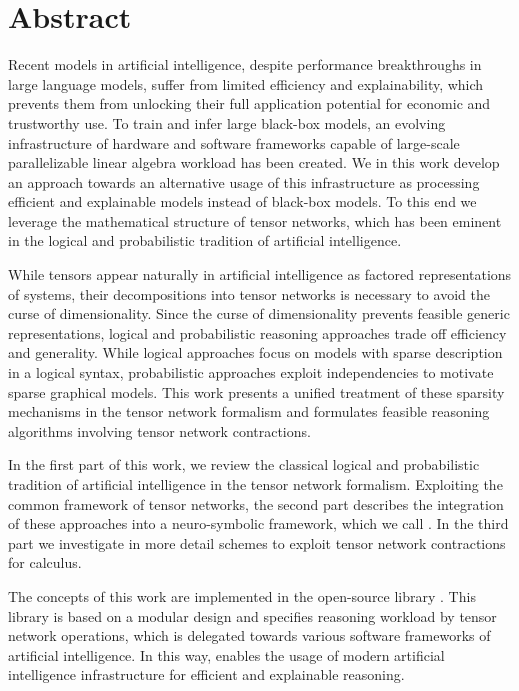 \chapter{Abstract}

Recent models in artificial intelligence, despite performance breakthroughs in large language models, suffer from limited efficiency and explainability, which prevents them from unlocking their full application potential for economic and trustworthy use.
To train and infer large black-box models, an evolving infrastructure of hardware and software frameworks capable of large-scale parallelizable linear algebra workload has been created.
We in this work develop an approach towards an alternative usage of this infrastructure as processing efficient and explainable models instead of black-box models.
To this end we leverage the mathematical structure of tensor networks, which has been eminent in the logical and probabilistic tradition of artificial intelligence.

While tensors appear naturally in artificial intelligence as factored representations of systems, their decompositions into tensor networks is necessary to avoid the curse of dimensionality. %
Since the curse of dimensionality prevents feasible generic representations, logical and probabilistic reasoning approaches trade off efficiency and generality.
While logical approaches focus on models with sparse description in a logical syntax, probabilistic approaches exploit independencies to motivate sparse graphical models.
This work presents a unified treatment of these sparsity mechanisms in the tensor network formalism and formulates feasible reasoning algorithms involving tensor network contractions.

In the first part of this work, we review the classical logical and probabilistic tradition of artificial intelligence in the tensor network formalism.
Exploiting the common framework of tensor networks, the second part describes the integration of these approaches into a neuro-symbolic framework, which we call \HybridLogicNetworks{}.
In the third part we investigate in more detail schemes to exploit tensor network contractions for calculus.

The concepts of this work are implemented in the open-source \python library \tnreason.
This library is based on a modular design and specifies reasoning workload by tensor network operations, which is delegated towards various software frameworks of artificial intelligence.
In this way, \tnreason enables the usage of modern artificial intelligence infrastructure for efficient and explainable reasoning.